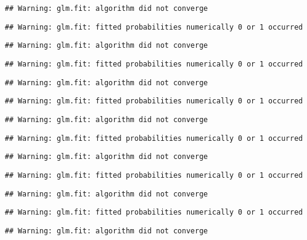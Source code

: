 \documentclass[]{article}
\begin{document}
\begin{verbatim}
## Warning: glm.fit: algorithm did not converge
\end{verbatim}

\begin{verbatim}
## Warning: glm.fit: fitted probabilities numerically 0 or 1 occurred
\end{verbatim}

\begin{verbatim}
## Warning: glm.fit: algorithm did not converge
\end{verbatim}

\begin{verbatim}
## Warning: glm.fit: fitted probabilities numerically 0 or 1 occurred
\end{verbatim}

\begin{verbatim}
## Warning: glm.fit: algorithm did not converge
\end{verbatim}

\begin{verbatim}
## Warning: glm.fit: fitted probabilities numerically 0 or 1 occurred
\end{verbatim}

\begin{verbatim}
## Warning: glm.fit: algorithm did not converge
\end{verbatim}

\begin{verbatim}
## Warning: glm.fit: fitted probabilities numerically 0 or 1 occurred
\end{verbatim}

\begin{verbatim}
## Warning: glm.fit: algorithm did not converge
\end{verbatim}

\begin{verbatim}
## Warning: glm.fit: fitted probabilities numerically 0 or 1 occurred
\end{verbatim}

\begin{verbatim}
## Warning: glm.fit: algorithm did not converge
\end{verbatim}

\begin{verbatim}
## Warning: glm.fit: fitted probabilities numerically 0 or 1 occurred
\end{verbatim}

\begin{verbatim}
## Warning: glm.fit: algorithm did not converge
\end{verbatim}
\end{document}

